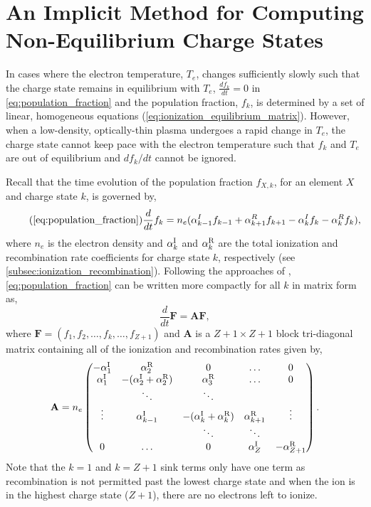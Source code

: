 \chapter{An Implicit Method for Computing Non-Equilibrium Charge States}\label{ap:nonequilibrium_implicit}
\thispagestyle{firstpageofchapterstyle}

 In cases where the electron temperature, $T_e$, changes sufficiently slowly such that the charge state remains in equilibrium with $T_e$, $\frac{df_k}{dt}=0$ in \autoref{eq:population_fraction} and the population fraction, $f_k$, is determined by a set of linear, homogeneous equations (\autoref{eq:ionization_equilibrium_matrix}). However, when a low-density, optically-thin plasma undergoes a rapid change in $T_e$, the charge state cannot keep pace with the electron temperature such that $f_k$ and $T_e$ are out of equilibrium and $df_k/dt$ cannot be ignored. 
 
 Recall that the time evolution of the population fraction $f_{X,k}$, for an element $X$ and charge state $k$, is governed by,
 \begin{equation*}\tag{\ref{eq:population_fraction}}
     \frac{d}{dt}f_k = n_e(\alpha_{k-1}^I f_{k-1} + \alpha_{k+1}^R f_{k+1} - \alpha_{k}^I f_k - \alpha_k^R f_k),
 \end{equation*}
 where $n_e$ is the electron density and $\alpha^\textup{I}_k$ and $\alpha^\textup{R}_k$ are the total ionization and recombination rate coefficients for charge state $k$, respectively (see \autoref{subsec:ionization_recombination}). Following the approaches of \citet{masai_x-ray_1984,hughes_self-consistent_1985}, \autoref{eq:population_fraction} can be written more compactly for all $k$ in matrix form as,
 \begin{equation}\label{eq:population_fraction_matrix}
     \frac{d}{dt}\mathbf{F} = \mathbf{A}\mathbf{F},
 \end{equation}
 where $\mathbf{F}=(f_1,f_2,\ldots,f_k,\ldots,f_{Z+1})$ and $\mathbf{A}$ is a $Z+1{\times}Z+1$ block tri-diagonal matrix containing all of the ionization and recombination rates given by,
 \begin{equation}\label{eq:rate_matrix}
    \mathbf{A} = n_e
        \begin{pmatrix}
            -\alpha^\textup{I}_1 & \alpha^\textup{R}_2 & 0 & \dots & 0 \\
            \alpha^\textup{I}_1 & -(\alpha^\textup{I}_2 + \alpha^\textup{R}_2) & \alpha^\textup{R}_3 & \dots & 0 \\
             & \ddots & \ddots & &  \\
            \vdots & \alpha^\textup{I}_{k-1} & -(\alpha^\textup{I}_k + \alpha^\textup{R}_k) & \alpha^\textup{R}_{k+1} & \vdots \\
             & & \ddots & \ddots & \\
            0 & \dots & 0 & \alpha^\textup{I}_{Z} & -\alpha^\textup{R}_{Z+1} 
        \end{pmatrix}.
\end{equation}
Note that the $k=1$ and $k=Z+1$ sink terms only have one term as recombination is not permitted past the lowest charge state and when the ion is in the highest charge state ($Z+1$), there are no electrons left to ionize.

